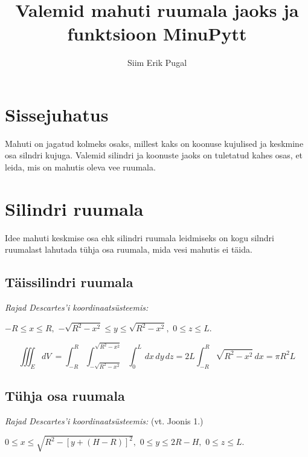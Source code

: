 \documentclass[a4paper]{article}
\title{Valemid mahuti ruumala jaoks ja funktsioon MinuPytt}
\author{Siim Erik Pugal}
\begin{document}
\maketitle

\section*{Sissejuhatus}
 Mahuti on jagatud kolmeks osaks, millest kaks on koonuse kujulised ja keskmine osa silndri kujuga. Valemid silindri ja koonuste jaoks on tuletatud kahes osas, et leida, mis on mahutis oleva vee ruumala.

\section*{Silindri ruumala}
 Idee mahuti keskmise osa ehk silindri ruumala leidmiseks on kogu silndri ruumalast lahutada tühja osa ruumala, mida vesi mahutis ei täida.

\subsection*{Täissilindri ruumala}

\begin{flushleft}
\textit{Rajad Descartes'i koordinaatsüsteemis:}
\begin{center}
$-R \leq x \leq R,$
\break
$-\sqrt{R^2-x^2} \leq y \leq \sqrt{R^2-x^2},$
\break
$ 0 \leq z \leq L.$
\end{center}
\end{flushleft}


\begin{equation}
\iiint_E dV\ = \int_{-R}^{R}\int_{-\sqrt{R^2-x^2}}^{\sqrt{R^2-x^2}}\int_{0}^{L} \,dx\,dy\,dz = 2 L \int_{-R}^{R} \sqrt{R^2-x^2} \,dx = \pi R^2 L
\end{equation}

\subsection*{Tühja osa ruumala}

\begin{flushleft}
\textit{Rajad Descartes'i koordinaatsüsteemis:} (vt. Joonis 1.)
\begin{center}
$0 \leq x \leq \sqrt{R^2 - [y+(H-R)]^2},$
\break
$ 0 \leq y \leq 2 R - H,$
\break
$ 0 \leq z \leq L.$
\end{center}
\end{flushleft}
\end{document}
